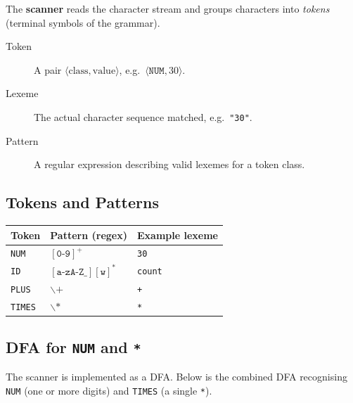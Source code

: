 \documentclass[12pt,a4paper]{article}
\begin{document}
The \textbf{scanner} reads the character stream and groups characters into
\emph{tokens} (terminal symbols of the grammar).

\begin{description}
  \item[Token] A pair $\langle\text{class}, \text{value}\rangle$,
        e.g.\ $\langle\mathtt{NUM}, 30\rangle$.
  \item[Lexeme] The actual character sequence matched, e.g.\ \texttt{"30"}.
  \item[Pattern] A regular expression describing valid lexemes for a token class.
\end{description}

\subsection{Tokens and Patterns}

\begin{center}
\begin{tabular}{lll}
\toprule
Token & Pattern (regex) & Example lexeme\\
\midrule
\texttt{NUM}   & $[\texttt{0-9}]^+$                 & \texttt{30}\\
\texttt{ID}    & $[\texttt{a-zA-Z\_}][\texttt{w}]^*$ & \texttt{count}\\
\texttt{PLUS}  & $\backslash\texttt{+}$              & \texttt{+}\\
\texttt{TIMES} & $\backslash\texttt{*}$              & \texttt{*}\\
\bottomrule
\end{tabular}
\end{center}

\subsection{DFA for \texttt{NUM} and \texttt{*}}

The scanner is implemented as a DFA.
Below is the combined DFA recognising \texttt{NUM} (one or more digits) and
\texttt{TIMES} (a single \texttt{*}).

\begin{center}
\end{center}
\end{document}
